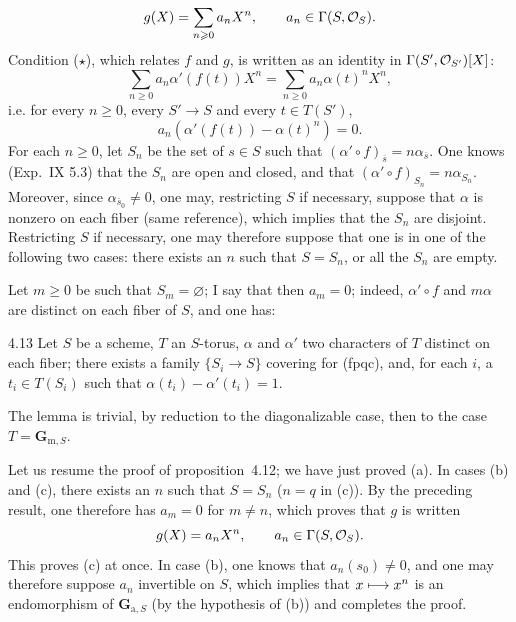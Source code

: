 \[
g(X)=\sum_{n\geqslant0}a_nX^n,\qquad a_n\in\Gamma(S,\mathcal{O}_S).
\]
Condition ($\star$), which relates $f$ and $g$, is written as an identity in $\Gamma(S',\mathcal{O}_{S'})[X]$:
\[
\sum_{n\geq0}a_n\alpha'(f(t))X^n=\sum_{n\geq0}a_n\alpha(t)^nX^n,
\]
i.e. for every $n\geq0$, every $S'\to S$ and every $t\in T(S')$,
\[
a_n(\alpha'(f(t))-\alpha(t)^n)=0.
\]
For each $n\geq0$, let $S_n$ be the set of $s\in S$ such that $(\alpha'\circ f)_{\overline{s}}=n\alpha_{\overline{s}}$. One knows (Exp.~IX 5.3) that the $S_n$ are open and closed, and that $(\alpha'\circ f)_{S_n}=n\alpha_{S_n}$. Moreover, since $\alpha_{\overline{s}_0}\ne0$, one may, restricting $S$ if necessary, suppose that $\alpha$ is nonzero on each fiber (same reference), which implies that the $S_n$ are disjoint. Restricting $S$ if necessary, one may therefore suppose that one is in one of the following two cases: there exists an $n$ such that $S=S_n$, or all the $S_n$ are empty.

Let $m\geq0$ be such that $S_m=\varnothing$; I say that then $a_m=0$; indeed, $\alpha'\circ f$ and $m\alpha$ are distinct on each fiber of $S$, and one has:
\begin{lemma}{4.13}\label{XIX.4.13}
Let $S$ be a scheme, $T$ an $S$-torus, $\alpha$ and $\alpha'$ two characters of $T$ distinct on each fiber; there exists a family $\{S_i\to S\}$ covering for (fpqc), and, for each $i$, a $t_i\in T(S_i)$ such that $\alpha(t_i)-\alpha'(t_i)=1$.
\end{lemma}
The lemma is trivial, by reduction to the diagonalizable case, then to the case $T=\mathbf{G}_{\mathrm m,S}$.

Let us resume the proof of proposition~4.12; we have just proved (a). In cases (b) and (c), there exists an $n$ such that $S=S_n$ ($n=q$ in (c)). By the preceding result, one therefore has $a_m=0$ for $m\ne n$, which proves that $g$ is written
\[
g(X)=a_nX^n,\qquad a_n\in\Gamma(S,\mathcal{O}_S).
\]
This proves (c) at once. In case (b), one knows that $a_n(s_0)\ne0$, and one may therefore suppose $a_n$ invertible on $S$, which implies that $x\longmapsto x^n$ is an endomorphism of $\mathbf{G}_{\mathrm a,S}$ (by the hypothesis of (b)) and completes the proof.
